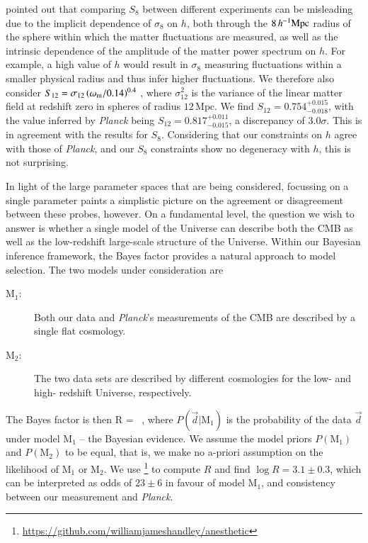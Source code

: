 \citet{Sanchez2020} pointed out that comparing $S_{8}$ between different experiments can be misleading due to the implicit dependence of $\sigma_{8}$ on $h$, both through the $8\,h^{-1}{\rm Mpc}$ radius of the sphere within which the matter fluctuations are measured, as well as the intrinsic dependence of the amplitude of the matter power spectrum on $h$. 
For example, a high value of $h$ would result in $\sigma_{8}$ measuring fluctuations within a smaller physical radius and thus infer higher fluctuations. 
We therefore also consider $S_{12} = \sigma_{12}\left(\omega_{\rm m}/0.14\right)^{0.4}$ \citep{Sanchez2020}, where $\sigma_{12}^{2}$ is the variance of the linear matter field at redshift zero in spheres of radius $12\,\mathrm{Mpc}$.
We find $S_{12} = 0.754^{+0.015}_{-0.018}$, with the value inferred by {\it Planck} being $S_{12} = 0.817_{-0.015}^{+0.011}
$, a discrepancy of $3.0\sigma$. 
This is in agreement with the results for $S_{8}$. 
Considering that our \tttp constraints on $h$ agree with those of {\it Planck}, and our $S_{8}$ constraints show no degeneracy with $h$, this is not surprising.

In light of the large parameter spaces that are being considered, focussing on a single parameter paints a simplistic picture on the agreement or disagreement between these probes, however. 
On a fundamental level, the question we wish to answer is whether a single model of the Universe can describe both the CMB as well as the low-redshift large-scale structure of the Universe.
Within our Bayesian inference framework, the Bayes factor provides a natural approach to model selection. 
The two models under consideration are 
\begin{description}
	\item[$\mathrm{M}_1$:] Both our \tttp data and {\it Planck}'s measurements of the CMB are described by a single flat \LCDM cosmology.
	\item[$\mathrm{M}_2$:] The two data sets are described by different cosmologies for the low- and high- redshift Universe, respectively.
\end{description}
The Bayes factor is then
\be
\label{equ:bayes-factor}
	R =  \ ,
\ee
where $P(\vec d | \mathrm{M}_1)$ is the probability of the data $\vec d$ under model $\mathrm{M}_1$ -- the Bayesian evidence. 
We assume the model priors $P(\mathrm{M}_1)$ and $P(\mathrm{M}_2)$ to be equal, that is, we make no a-priori assumption on the likelihood of $\mathrm{M}_1$ or $\mathrm{M}_2$. 
We use \footnote{\url{https://github.com/williamjameshandley/anesthetic}}\citep{anesthetic} to compute $R$ and find $\log R=3.1\pm0.3$, which can be interpreted as odds of $23\pm6$ in favour of model $\mathrm{M}_1$, and consistency between our \tttp measurement and {\it Planck}. 

